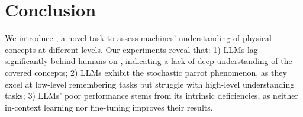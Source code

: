 \section{Conclusion}
We introduce \datasetnamens, a novel task to assess
machines' understanding of physical concepts at different levels.
Our experiments reveal that:
1) LLMs lag significantly behind humans on \datasetnamens, indicating a lack of deep understanding of the covered concepts;
2) LLMs exhibit the stochastic parrot phenomenon, as they excel at low-level remembering tasks but struggle with high-level understanding tasks;
3) LLMs' poor performance stems from its intrinsic deficiencies, as neither in-context learning nor fine-tuning improves their results.





